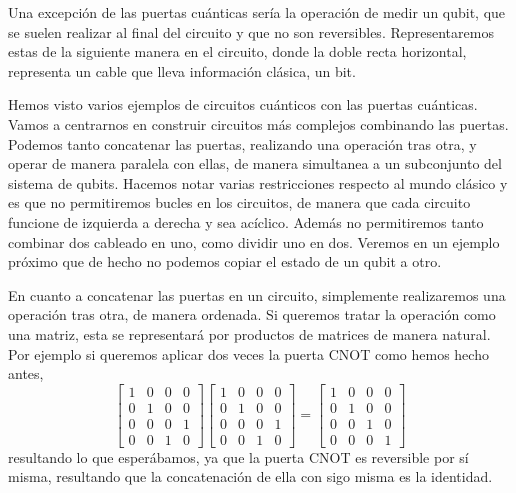\documentclass[a4paper]{article}
\numberwithin{equation}{section}
\begin{document}
Una excepción de las puertas cuánticas sería la operación de medir un qubit, que se suelen realizar al final del circuito y que no son reversibles. Representaremos estas de la siguiente manera en el circuito, donde la doble recta horizontal, representa un cable que lleva información clásica, un bit.
\begin{figure}[h]
\centering
{}
\end{figure}

Hemos visto varios ejemplos de circuitos cuánticos con las puertas cuánticas. Vamos a centrarnos en construir circuitos más complejos combinando las puertas. Podemos tanto concatenar las puertas, realizando una operación tras otra, y operar de manera paralela con ellas, de manera simultanea a un subconjunto del sistema de qubits. Hacemos notar varias restricciones respecto al mundo clásico y es que no permitiremos bucles en los circuitos, de manera que cada circuito funcione de izquierda a derecha y sea acíclico. Además no permitiremos tanto combinar dos cableado en uno, como dividir uno en dos. Veremos en un ejemplo próximo que de hecho no podemos copiar el estado de un qubit a otro.

En cuanto a concatenar las puertas en un circuito, simplemente realizaremos una operación tras otra, de manera ordenada. Si queremos tratar la operación como una matriz, esta se representará por productos de matrices de manera natural. Por ejemplo si queremos aplicar dos veces la puerta CNOT como hemos hecho antes,
\begin{equation}
\begin{bmatrix}
1 & 0 & 0 & 0 \\
0 & 1 & 0 & 0 \\
0 & 0 & 0 & 1 \\
0 & 0 & 1 & 0 
\end{bmatrix}
\begin{bmatrix}
1 & 0 & 0 & 0 \\
0 & 1 & 0 & 0 \\
0 & 0 & 0 & 1 \\
0 & 0 & 1 & 0 
\end{bmatrix} = 
\begin{bmatrix}
1 & 0 & 0 & 0 \\
0 & 1 & 0 & 0 \\
0 & 0 & 1 & 0 \\
0 & 0 & 0 & 1 
\end{bmatrix}
\end{equation}
resultando lo que esperábamos, ya que la puerta CNOT es reversible por sí misma, resultando que la concatenación de ella con sigo misma es la identidad.
\end{document}
